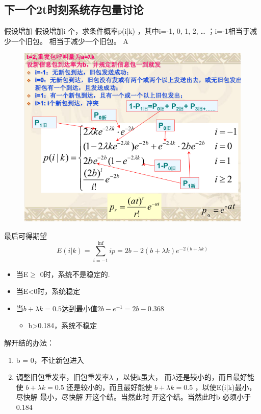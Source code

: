 \subsection{下一个2t时刻系统存包量讨论}
 假设增加 假设增加i 个，求条件概率p(i|k) ，其中i=-1,
0, 1, 2, …  ；i=-1相当于减少一个旧包。 相当于减少一个旧包。
A
\begin{figure}[H]
	\centering
	\includegraphics[width=0.7\linewidth]{figures/screenshot004}
	\caption{}
	\label{fig:screenshot004}
\end{figure}
最后可得期望
\[ 
E(i|k) = \sum_{i=-1}^{\inf}ip = 2b - 2(b+\lambda k)e^{-2(b+\lambda k)}
 \]
\begin{itemize}
	\item 当E$ \ge $ 0时，系统不是稳定的.
	\item 当E<0时，系统稳定
	\item 当$ b+\lambda k = 0.5 $达到最小值$ 2b -e^{-1} = 2b - 0.368 $
	\begin{itemize}
		\item b>0.184，系统不稳定
	\end{itemize}
\end{itemize}
解开结的办法：
\begin{enumerate}
	\item b = 0，不让新包进入
	\item 调整旧包重发率，旧包重发率$ \lambda $ ，以使k虽大， 
	而$ \lambda $还是较小的，而且最好能使 $ b+\lambda k=0.5 $ 还是较小的，而且最好能使
	$ b+\lambda k=0.5 $ ，以使E(i|k)最小，尽快解 最小，尽快解
	开这个结。当然此时 开这个结。当然此时b 必须小于0.184
\end{enumerate}
